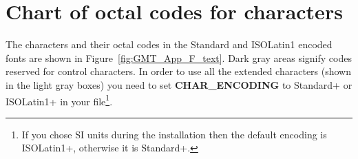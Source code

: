 %
%
\chapter{Chart of octal codes for characters}
\label{app:F}
\thispagestyle{headings}

The characters and their octal codes in the Standard and ISOLatin1 encoded fonts
are shown in Figure~\ref{fig:GMT_App_F_text}.  Dark gray areas signify codes reserved for
control characters.  In order to use all the extended characters (shown in the light gray boxes) you need to
set {\bf CHAR\_ENCODING} to Standard+ or ISOLatin1+ in your  file\footnote{If you chose
SI units during the installation then the default encoding is ISOLatin1+, otherwise it is Standard+.}.

